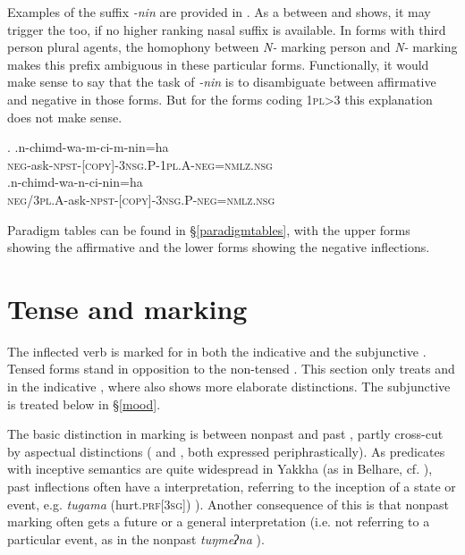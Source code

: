 	
Examples of the suffix \emph{-nin} are provided in \Next. As a  between \Next[a] and \Next[b] shows, it may trigger the  too, if no higher ranking nasal suffix is available. In forms with third person plural agents, the homophony between \emph{N-} marking person and \emph{N-} marking  makes this prefix ambiguous in these particular forms. Functionally, it would make sense to say that the task of \emph{-nin} is to disambiguate between affirmative and negative in those forms. But for the forms coding {\scshape 1pl>3} this explanation does not make sense. 
 
 \ex. \ag.n-chimd-wa-m-ci-m-nin=ha\\
			{\scshape neg-}ask{\scshape -npst-[copy]-3nsg.P-1pl.A-neg=nmlz.nsg}\\
 	\bg.n-chimd-wa-n-ci-nin=ha\\
		{\scshape neg/3pl.A-}ask{\scshape -npst-[copy]-3nsg.P-neg=nmlz.nsg}\\
		
Paradigm tables can be found in §\ref{paradigmtables}, with the upper forms showing the affirmative and the lower forms showing the negative inflections. 	


\section{Tense and  marking }\label{tense}

The inflected verb is marked  for  in both the indicative and the subjunctive . Tensed forms stand in opposition to the non-tensed . This section only treats  and  in the indicative , where  also shows more elaborate distinctions. The subjunctive is treated below in §\ref{mood}.

The basic distinction in  marking is between nonpast and past , partly cross-cut by aspectual distinctions ( and  , both expressed periphrastically). As predicates with inceptive semantics are quite wide\-spread in Yakkha (as in Belhare, cf. \citealt{Bickel1996Aspect}), past inflections often have a  interpretation, referring to the inception of a state or event, e.g. \emph{tugama}  (hurt.{\scshape prf[3sg]}) ). Another consequence of this is that nonpast marking often gets a future  or a general interpretation (i.e. not referring to a particular event, as in  the nonpast \emph{tuŋmeʔna} ). 

